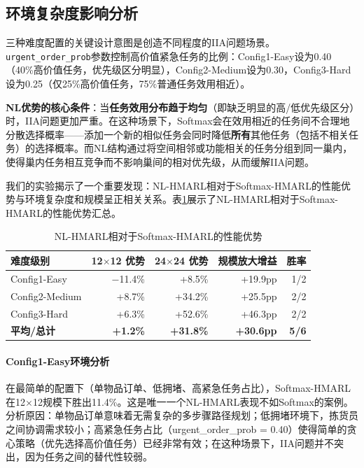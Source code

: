 \documentclass[12pt,a4paper]{article}
\begin{document}
\subsection{环境复杂度影响分析}

三种难度配置的关键设计意图是创造不同程度的IIA问题场景。\texttt{urgent\_order\_prob}参数控制高价值紧急任务的比例：Config1-Easy设为0.40（40\%高价值任务，优先级区分明显），Config2-Medium设为0.30，Config3-Hard设为0.25（仅25\%高价值任务，75\%普通任务效用相近）。

\textbf{NL优势的核心条件}：当\textbf{任务效用分布趋于均匀}（即缺乏明显的高/低优先级区分）时，IIA问题更加严重。在这种场景下，Softmax会在效用相近的任务间不合理地分散选择概率——添加一个新的相似任务会同时降低\textbf{所有}其他任务（包括不相关任务）的选择概率。而NL结构通过将空间相邻或功能相关的任务分组到同一巢内，使得巢内任务相互竞争而不影响巢间的相对优先级，从而缓解IIA问题。

我们的实验揭示了一个重要发现：NL-HMARL相对于Softmax-HMARL的性能优势与环境复杂度和规模呈正相关关系。表\ref{tab:nl_advantage_cn}展示了NL-HMARL相对于Softmax-HMARL的性能优势汇总。

\begin{table}[ht]
\centering
\caption{NL-HMARL相对于Softmax-HMARL的性能优势}
\label{tab:nl_advantage_cn}
\begin{tabular}{lrrrr}
\toprule
\textbf{难度级别} & \textbf{12$\times$12 优势} & \textbf{24$\times$24 优势} & \textbf{规模放大增益} & \textbf{胜率} \\
\midrule
Config1-Easy & $-$11.4\% & +8.5\% & +19.9pp & 1/2 \\
Config2-Medium & +8.7\% & +34.2\% & +25.5pp & 2/2 \\
Config3-Hard & +6.3\% & +52.6\% & +46.3pp & 2/2 \\
\midrule
\textbf{平均/总计} & \textbf{+1.2\%} & \textbf{+31.8\%} & \textbf{+30.6pp} & \textbf{5/6} \\
\bottomrule
\end{tabular}
\end{table}

\paragraph{Config1-Easy环境分析}

在最简单的配置下（单物品订单、低拥堵、高紧急任务占比），Softmax-HMARL在12$\times$12规模下胜出11.4\%。这是唯一一个NL-HMARL表现不如Softmax的案例。分析原因：单物品订单意味着无需复杂的多步骤路径规划；低拥堵环境下，拣货员之间协调需求较小；高紧急任务占比（urgent\_order\_prob = 0.40）使得简单的贪心策略（优先选择高价值任务）已经非常有效；在这种场景下，IIA问题并不突出，因为任务之间的替代性较弱。
\end{document}
